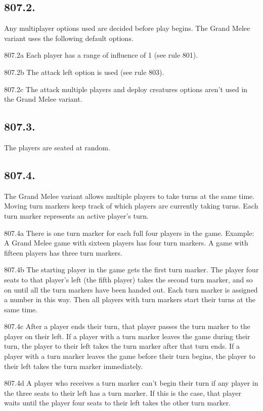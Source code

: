 \subsection*{807.2.}
Any multiplayer options used are decided before play begins. The Grand Melee variant uses the following default options.

807.2a Each player has a range of influence of 1 (see rule 801).

807.2b The attack left option is used (see rule 803).

807.2c The attack multiple players and deploy creatures options aren’t used in the Grand Melee variant.

\subsection*{807.3.}
The players are seated at random.

\subsection*{807.4.}
The Grand Melee variant allows multiple players to take turns at the same time. Moving turn markers keep track of which players are currently taking turns. Each turn marker represents an active player’s turn.

807.4a There is one turn marker for each full four players in the game.
Example: A Grand Melee game with sixteen players has four turn markers. A game with fifteen players has three turn markers.

807.4b The starting player in the game gets the first turn marker. The player four seats to that player’s left (the fifth player) takes the second turn marker, and so on until all the turn markers have been handed out. Each turn marker is assigned a number in this way. Then all players with turn markers start their turns at the same time.

807.4c After a player ends their turn, that player passes the turn marker to the player on their left. If a player with a turn marker leaves the game during their turn, the player to their left takes the turn marker after that turn ends. If a player with a turn marker leaves the game before their turn begins, the player to their left takes the turn marker immediately.

807.4d A player who receives a turn marker can’t begin their turn if any player in the three seats to their left has a turn marker. If this is the case, that player waits until the player four seats to their left takes the other turn marker.

